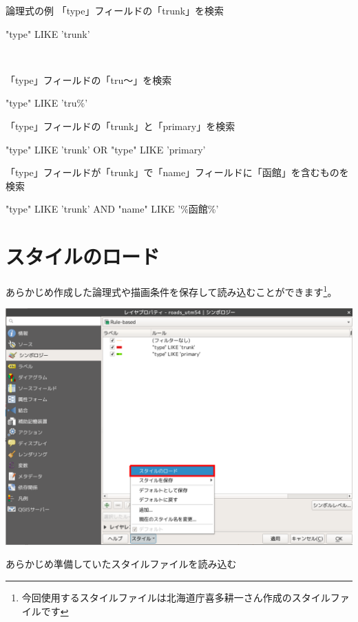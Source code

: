 \documentclass[14Q,twocolumn]{jsarticle}
\makeatletter
\newenvironment{figurehere}
  {\def\@captype{figure}}
  {}
\makeatother
\begin{document}
\begin{itembox}[l]{論理式の例}
「type」フィールドの「trunk」を検索

\begin{center} "type"  LIKE 'trunk' 
\end{center}　　

「type」フィールドの「tru〜」を検索

\begin{center}  "type"  LIKE 'tru\%'
\end{center}

「type」フィールドの「trunk」と「primary」を検索

\begin{center}  "type"  LIKE 'trunk' OR "type"  LIKE 'primary'
\end{center}

「type」フィールドが「trunk」で「name」フィールドに「函館」を含むものを検索

\begin{center}   "type"  LIKE 'trunk' AND "name"  LIKE '\%函館\%'
\end{center}
\end{itembox}

\section{スタイルのロード}
あらかじめ作成した論理式や描画条件を保存して読み込むことができます\footnote{今回使用するスタイルファイルは北海道庁喜多耕一さん作成のスタイルファイルです}。

\begin{figurehere}
\centering
\includegraphics[width=1\linewidth]{16.png}
\caption{あらかじめ準備していたスタイルファイルを読み込む}
\end{figurehere}
\end{document}
